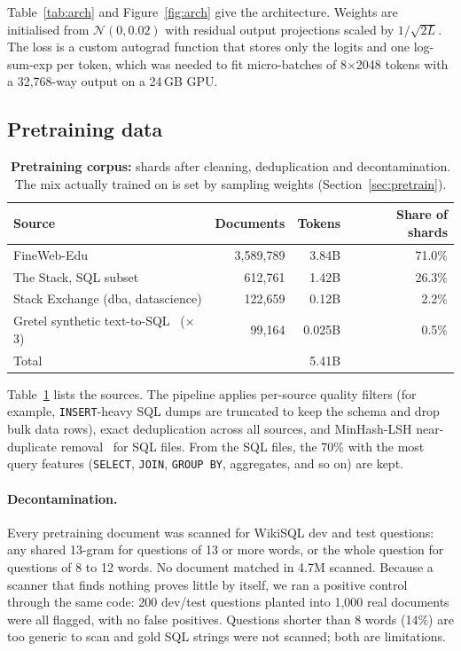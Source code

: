 \documentclass[11pt]{article}
\begin{document}
Table~\ref{tab:arch} and Figure~\ref{fig:arch} give the architecture. Weights are initialised from $\mathcal{N}(0, 0.02)$ with residual output projections scaled by $1/\sqrt{2L}$. The loss is a custom autograd function that stores only the logits and one log-sum-exp per token, which was needed to fit micro-batches of 8$\times$2048 tokens with a 32,768-way output on a 24\,GB GPU.

\subsection{Pretraining data}

\begin{table}[t]
\centering
\small
\begin{tabular}{lrrr}
\toprule
Source & Documents & Tokens & Share of shards \\
\midrule
FineWeb-Edu~\cite{penedo2024fineweb} & 3,589,789 & 3.84B & 71.0\% \\
The Stack, SQL subset~\cite{kocetkov2022stack} & 612,761 & 1.42B & 26.3\% \\
Stack Exchange (dba, datascience) & 122,659 & 0.12B & 2.2\% \\
Gretel synthetic text-to-SQL~\cite{gretel2024synthetic} ($\times$3) & 99,164 & 0.025B & 0.5\% \\
\midrule
Total & & 5.41B & \\
\bottomrule
\end{tabular}
\caption{\textbf{Pretraining corpus:} shards after cleaning, deduplication and decontamination. The mix actually trained on is set by sampling weights (Section~\ref{sec:pretrain}).}
\label{tab:data}
\end{table}

Table~\ref{tab:data} lists the sources. The pipeline applies per-source quality filters (for example, \texttt{INSERT}-heavy SQL dumps are truncated to keep the schema and drop bulk data rows), exact deduplication across all sources, and MinHash-LSH near-duplicate removal~\cite{broder1997minhash} for SQL files. From the SQL files, the 70\% with the most query features (\texttt{SELECT}, \texttt{JOIN}, \texttt{GROUP BY}, aggregates, and so on) are kept.

\paragraph{Decontamination.} Every pretraining document was scanned for WikiSQL dev and test questions: any shared 13-gram for questions of 13 or more words, or the whole question for questions of 8 to 12 words. No document matched in 4.7M scanned. Because a scanner that finds nothing proves little by itself, we ran a positive control through the same code: 200 dev/test questions planted into 1,000 real documents were all flagged, with no false positives. Questions shorter than 8 words (14\%) are too generic to scan and gold SQL strings were not scanned; both are limitations.
\end{document}
